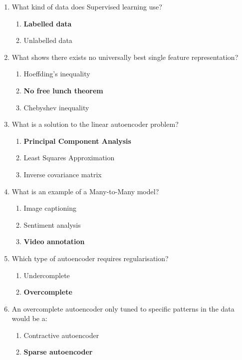 \documentclass{report}
\numberwithin{equation}{section}
\begin{document}
\begin{enumerate}
    \item What kind of data does Supervised learning use?
    \begin{enumerate}[label=\alph*.]
        \item \textbf{Labelled data}
        \item Unlabelled data
    \end{enumerate}
    \item What shows there exists no universally best single feature representation?
    \begin{enumerate}[label=\alph*.]
        \item Hoeffding's inequality
        \item \textbf{No free lunch theorem}
        \item Chebyshev inequality
    \end{enumerate}
    \item What is a solution to the linear autoencoder problem?
    \begin{enumerate}[label=\alph*.]
        \item \textbf{Principal Component Analysis}
        \item Least Squares Approximation
        \item Inverse covariance matrix
    \end{enumerate}
    \item What is an example of a Many-to-Many model?
    \begin{enumerate}[label=\alph*.]
        \item Image captioning
        \item Sentiment analysis
        \item \textbf{Video annotation}
    \end{enumerate}
    \item Which type of autoencoder requires regularisation?
    \begin{enumerate}[label=\alph*.]
        \item Undercomplete
        \item \textbf{Overcomplete}
    \end{enumerate}
    \item An overcomplete autoencoder only tuned to specific patterns in the data would be a:
    \begin{enumerate}[label=\alph*.]
        \item Contractive autoencoder
        \item \textbf{Sparse autoencoder}

\end{enumerate}
\end{enumerate}
\end{document}
